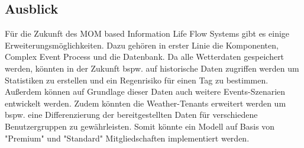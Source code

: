 \subsection{Ausblick}

Für die Zukunft des MOM based Information Life Flow Systems gibt es einige Erweiterungsmöglichkeiten. Dazu gehören in erster Linie die Komponenten, Complex Event Process und die Datenbank. Da alle Wetterdaten gespeichert werden, könnten in der Zukunft bspw. auf historische Daten zugriffen werden um Statistiken zu erstellen und ein Regenrisiko für einen Tag zu bestimmen. Außerdem können auf Grundlage dieser Daten auch weitere Events-Szenarien entwickelt werden. Zudem könnten die Weather-Tenants erweitert werden um bspw. eine Differenzierung der bereitgestellten Daten für verschiedene Benutzergruppen zu gewährleisten. Somit könnte ein Modell auf Basis von "Premium" und "Standard" Mitgliedschaften implementiert werden.
